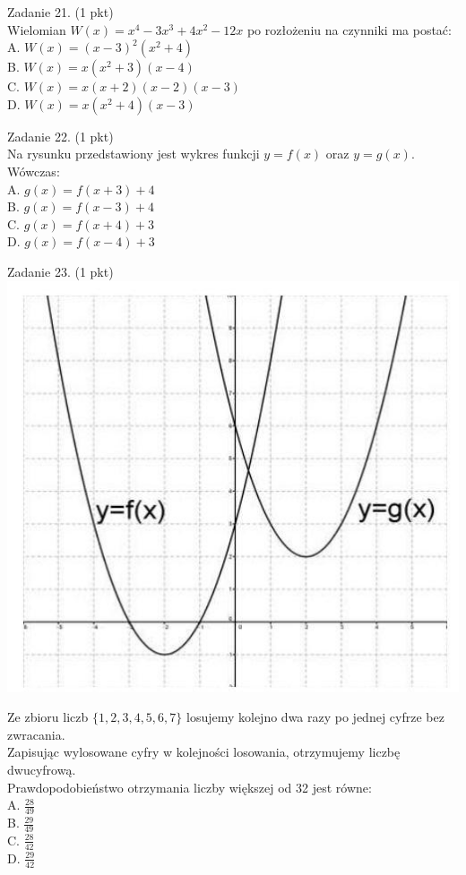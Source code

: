 \documentclass[10pt]{article}
\begin{document}
Zadanie 21. (1 pkt)\\
Wielomian \(W(x)=x^{4}-3 x^{3}+4 x^{2}-12 x\) po rozłożeniu na czynniki ma postać:\\
A. \(W(x)=(x-3)^{2}\left(x^{2}+4\right)\)\\
B. \(W(x)=x\left(x^{2}+3\right)(x-4)\)\\
C. \(W(x)=x(x+2)(x-2)(x-3)\)\\
D. \(W(x)=x\left(x^{2}+4\right)(x-3)\)

Zadanie 22. (1 pkt)\\
Na rysunku przedstawiony jest wykres funkcji \(y=f(x)\) oraz \(y=g(x)\). Wówczas:\\
A. \(g(x)=f(x+3)+4\)\\
B. \(g(x)=f(x-3)+4\)\\
C. \(g(x)=f(x+4)+3\)\\
D. \(g(x)=f(x-4)+3\)

Zadanie 23. (1 pkt)\\
\includegraphics[max width=\textwidth, center]{2024_11_21_b31e6de468170710de69g-08(1)}

Ze zbioru liczb \(\{1,2,3,4,5,6,7\}\) losujemy kolejno dwa razy po jednej cyfrze bez zwracania.\\
Zapisując wylosowane cyfry w kolejności losowania, otrzymujemy liczbę dwucyfrową.\\
Prawdopodobieństwo otrzymania liczby większej od 32 jest równe:\\
A. \(\frac{28}{49}\)\\
B. \(\frac{29}{49}\)\\
C. \(\frac{28}{42}\)\\
D. \(\frac{29}{42}\)
\end{document}
